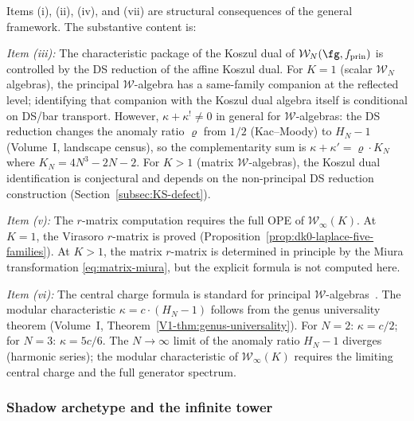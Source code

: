 \begin{remark}
\label{rem:M5-package-scope}
Items (i), (ii), (iv), and (vii) are structural
consequences of the general framework. The substantive content is:

\emph{Item (iii):} The characteristic package of the Koszul dual of
$\mathcal{W}_N(\fg, f_{\mathrm{prin}})$ is controlled by the DS
reduction of the affine Koszul dual. For $K = 1$ (scalar
$\mathcal{W}_N$ algebras), the principal $\mathcal{W}$-algebra has
a same-family companion at the reflected level; identifying that
companion with the Koszul dual algebra itself is conditional on
DS/bar transport. However, $\kappa + \kappa^! \ne 0$ in general for
$\mathcal{W}$-algebras: the DS reduction changes the anomaly ratio
$\varrho$ from $1/2$ (Kac--Moody) to $H_N - 1$
(Volume~I, landscape census), so the complementarity sum is
$\kappa + \kappa' = \varrho \cdot K_N$ where $K_N = 4N^3 - 2N - 2$.
For $K > 1$ (matrix $\mathcal{W}$-algebras),
the Koszul dual identification is conjectural and depends on the
non-principal DS reduction construction
(Section~\ref{subsec:KS-defect}).

\emph{Item (v):} The $r$-matrix computation requires the
full OPE of $\mathcal{W}_\infty(K)$. At $K = 1$, the
Virasoro $r$-matrix is proved
(Proposition~\ref{prop:dk0-laplace-five-families}).
At $K > 1$, the matrix $r$-matrix is determined in
principle by the Miura transformation
\eqref{eq:matrix-miura}, but the explicit formula is not
computed here.

\emph{Item (vi):} The central charge formula is standard for principal
$\mathcal{W}$-algebras~\cite{FL88}. The modular characteristic
$\kappa = c \cdot (H_N - 1)$ follows from the genus universality theorem
\textup{(}Volume~I, Theorem~\textup{\ref*{V1-thm:genus-universality}}\textup{)}.
For $N = 2$: $\kappa = c/2$; for $N = 3$: $\kappa = 5c/6$.
The $N \to \infty$ limit of the anomaly ratio $H_N - 1$ diverges
\textup{(}harmonic series\textup{)}; the modular characteristic of
$\mathcal{W}_\infty(K)$ requires the limiting central charge and the
full generator spectrum.
\end{remark}

\subsubsection{Shadow archetype and the infinite tower}

